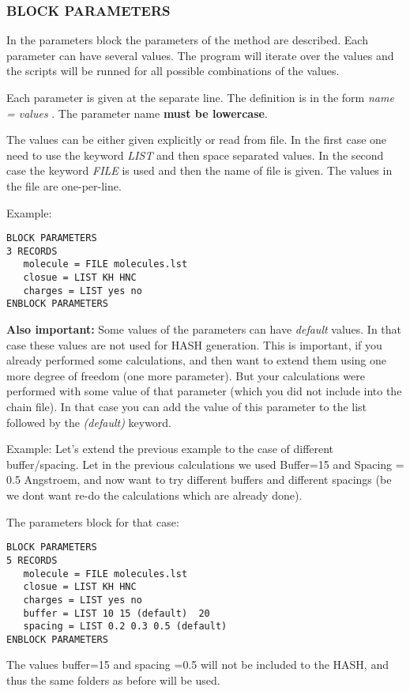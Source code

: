 \documentclass[12pt]{article}
\begin{document}
\subsubsection{BLOCK PARAMETERS}

In the parameters block the parameters of the method are described.
Each parameter can have several values.
The program will iterate over the values and the scripts will be runned for all possible combinations of the values.

Each parameter is given at the separate line.
The definition is in the form
\emph{name = values }.
The parameter name \textbf{must be lowercase}.

The values can be either given explicitly or read from file.
In the first case one need to use the keyword \emph{LIST} and then space separated values.
In the second case the keyword \emph{FILE} is used and then the name of file is given.
The values in the file are one-per-line.

Example:
\begin{verbatim}
BLOCK PARAMETERS
3 RECORDS
   molecule = FILE molecules.lst
   closue = LIST KH HNC
   charges = LIST yes no
ENBLOCK PARAMETERS
\end{verbatim}


\textbf{Also important:}
Some values of the parameters can have \emph{default} values.
In that case these values are not used for HASH generation.
This is important, if you already performed some calculations, and then want to extend them using one more degree of freedom (one more parameter).
But your calculations were performed with some value of that parameter (which you did not include into the chain file).
In that case you can add the value of this parameter to the list followed by the \emph{(default)} keyword.

Example: 
Let's extend the previous example to the case of different buffer/spacing.
Let in the previous calculations we used Buffer=15 and Spacing = 0.5 Angstroem, and now want to try different buffers and different spacings (be we dont want re-do the calculations which are already done).

The parameters block for that case:
\begin{verbatim}
BLOCK PARAMETERS
5 RECORDS
   molecule = FILE molecules.lst
   closue = LIST KH HNC
   charges = LIST yes no
   buffer = LIST 10 15 (default)  20
   spacing = LIST 0.2 0.3 0.5 (default)
ENBLOCK PARAMETERS
\end{verbatim}
 
 The values buffer=15 and spacing =0.5 will not be included to the HASH, and thus the same folders as before will be used.
\end{document}
